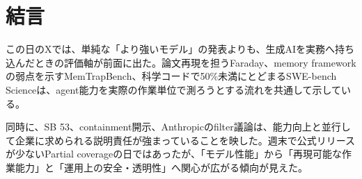 \section*{結言}
この日のXでは、単純な「より強いモデル」の発表よりも、生成AIを実務へ持ち込んだときの評価軸が前面に出た。論文再現を担うFaraday、memory frameworkの弱点を示すMemTrapBench、科学コードで50\%未満にとどまるSWE-bench Scienceは、agent能力を実際の作業単位で測ろうとする流れを共通して示している。

同時に、SB 53、containment開示、Anthropicのfilter議論は、能力向上と並行して企業に求められる説明責任が強まっていることを映した。週末で公式リリースが少ないPartial coverageの日ではあったが、「モデル性能」から「再現可能な作業能力」と「運用上の安全・透明性」へ関心が広がる傾向が見えた。
